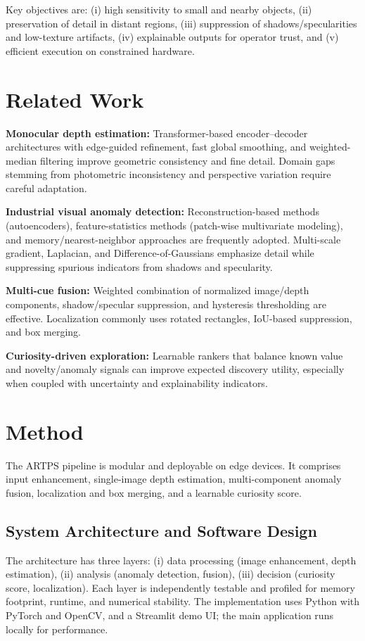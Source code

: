 \documentclass[12pt]{article}
\begin{document}
Key objectives are: (i) high sensitivity to small and nearby objects, (ii) preservation of detail in distant regions, (iii) suppression of shadows/specularities and low-texture artifacts, (iv) explainable outputs for operator trust, and (v) efficient execution on constrained hardware.

\section{Related Work}
\textbf{Monocular depth estimation:} Transformer-based encoder–decoder architectures with edge-guided refinement, fast global smoothing, and weighted-median filtering improve geometric consistency and fine detail. Domain gaps stemming from photometric inconsistency and perspective variation require careful adaptation.

\textbf{Industrial visual anomaly detection:} Reconstruction-based methods (autoencoders), feature-statistics methods (patch-wise multivariate modeling), and memory/nearest-neighbor approaches are frequently adopted. Multi-scale gradient, Laplacian, and Difference-of-Gaussians emphasize detail while suppressing spurious indicators from shadows and specularity.

\textbf{Multi-cue fusion:} Weighted combination of normalized image/depth components, shadow/specular suppression, and hysteresis thresholding are effective. Localization commonly uses rotated rectangles, IoU-based suppression, and box merging.

\textbf{Curiosity-driven exploration:} Learnable rankers that balance known value and novelty/anomaly signals can improve expected discovery utility, especially when coupled with uncertainty and explainability indicators.

\section{Method}
The ARTPS pipeline is modular and deployable on edge devices. It comprises input enhancement, single-image depth estimation, multi-component anomaly fusion, localization and box merging, and a learnable curiosity score.

\subsection{System Architecture and Software Design}
The architecture has three layers: (i) data processing (image enhancement, depth estimation), (ii) analysis (anomaly detection, fusion), (iii) decision (curiosity score, localization). Each layer is independently testable and profiled for memory footprint, runtime, and numerical stability. The implementation uses Python with PyTorch and OpenCV, and a Streamlit demo UI; the main application runs locally for performance.
\end{document}
